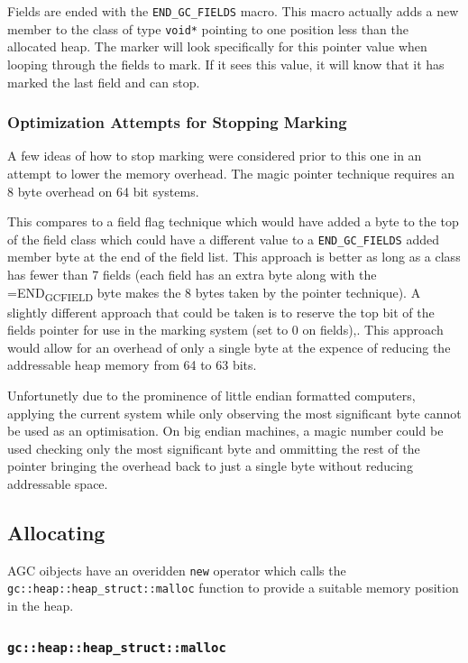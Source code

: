 \documentclass[11pt]{article}
\begin{document}
Fields are ended with the \texttt{END\_GC\_FIELDS} macro. This macro actually adds a new member to the class of type \texttt{void*} pointing
to one position less than the allocated heap. The marker will look specifically for this pointer value when looping through 
the fields to mark. If it sees this value, it will know that it has marked the last field and can stop.
\subsubsection{Optimization Attempts for Stopping Marking}
\label{sec:orge933d6c}
A few ideas of how to stop marking were considered prior to this one in an attempt to lower the memory overhead.
The magic pointer technique requires an 8 byte overhead on 64 bit systems.

This compares to a field flag technique which would have added a byte to the top of the field class which could have a different
value to a \texttt{END\_GC\_FIELDS} added member byte at the end of the field list. This approach is better as long as a class
has fewer than 7 fields (each field has an extra byte along with the =END\textsubscript{GC}\textsubscript{FIELD} byte makes the 8 bytes taken by the pointer technique).
A slightly different approach that could be taken is to reserve the top bit of the fields pointer for use in the marking system
(set to 0 on fields),. This approach would allow for an overhead of only a single byte at the expence of reducing the addressable heap 
memory from 64 to 63 bits.

Unfortunetly due to the prominence of little endian formatted computers, applying the current system while only observing the most
significant byte cannot be used as an optimisation. On big endian machines, a magic number could be used checking only the most significant
byte and ommitting the rest of the pointer bringing the overhead back to just a single byte without reducing addressable space.
\subsection{Allocating}
\label{sec:org5874d80}
AGC oibjects have an overidden \texttt{new} operator which calls the \texttt{gc::heap::heap\_struct::malloc} function to provide a suitable memory position
in the heap.
\subsubsection{\texttt{gc::heap::heap\_struct::malloc}}
\label{sec:org761231a}
\end{document}
